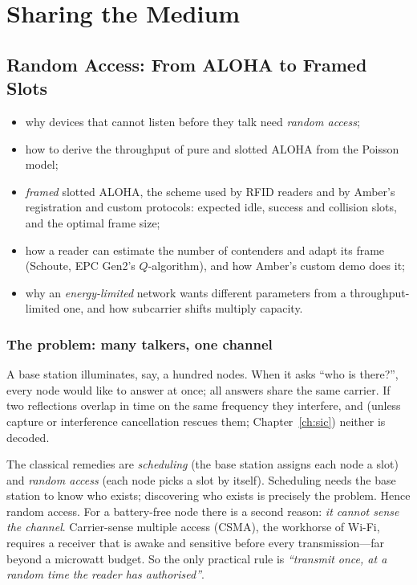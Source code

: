 \part{Sharing the Medium}

\chapter{Random Access: From ALOHA to Framed Slots}
\label{ch:aloha}

\begin{defbox}
\begin{itemize}
 \item why devices that cannot listen before they talk need \emph{random access};
 \item how to derive the throughput of pure and slotted ALOHA from the Poisson model;
 \item \emph{framed} slotted ALOHA, the scheme used by RFID readers and by Amber's registration and custom protocols: expected idle, success and collision slots, and the optimal frame size;
 \item how a reader can estimate the number of contenders and adapt its frame (Schoute, EPC Gen2's $Q$-algorithm), and how Amber's custom demo does it;
 \item why an \emph{energy-limited} network wants different parameters from a throughput-limited one, and how subcarrier shifts multiply capacity.
\end{itemize}
\end{defbox}

\section{The problem: many talkers, one channel}
\label{sec:aproblem}

A base station illuminates, say, a hundred nodes. When it asks ``who is there?'',
every node would like to answer at once; all answers share the same carrier. If two
reflections overlap in time on the same frequency they interfere, and (unless capture or
interference cancellation rescues them; Chapter~\ref{ch:sic}) neither is decoded.

The classical remedies are \emph{scheduling} (the base station assigns each node a
slot) and \emph{random access} (each node picks a slot by itself). Scheduling needs the
base station to know who exists; discovering who exists is precisely the problem. Hence
random access. For a battery-free node there is a second reason: \emph{it cannot
sense the channel}. Carrier-sense multiple access (CSMA), the workhorse of Wi-Fi, requires
a receiver that is awake and sensitive before every transmission---far beyond a
microwatt budget. So the only practical rule is \emph{``transmit once, at a random time
the reader has authorised''}.

